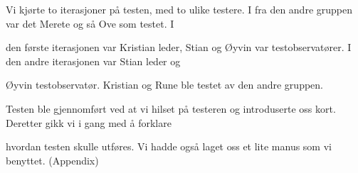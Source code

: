 Vi kjørte to iterasjoner på testen, med to ulike testere. I fra den andre gruppen var det Merete og så Ove som testet. I 

den første iterasjonen var Kristian leder, Stian og Øyvin var testobservatører. I den andre iterasjonen var Stian leder og 

Øyvin testobservatør. Kristian og Rune ble testet av den andre gruppen. 

Testen ble gjennomført ved at vi hilset på testeren og introduserte oss kort. Deretter gikk vi i gang med å forklare 

hvordan testen skulle utføres. Vi hadde også laget oss et lite manus som vi benyttet. (Appendix)


